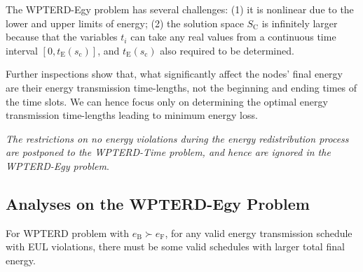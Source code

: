 \documentclass[12pt,journal,onecolumn,draftcls]{IEEEtran}
\begin{document}
The WPTERD-Egy problem has several challenges: (1) it is nonlinear due to the lower and upper limits of energy; (2) the solution space $S_\text{C}$ is infinitely larger because that the variables $t_i$ can take any real values from a continuous time interval $[0, t_\text{E}(s_\text{c})]$, and $t_\text{E}(s_\text{c})$ also required to be determined.

Further inspections show that, what significantly affect the nodes' final energy are their energy transmission time-lengths, not the beginning and ending times of the time slots. We can hence focus only on determining the optimal energy transmission time-lengths leading to minimum energy loss.

\textit{The restrictions on no energy violations during the energy redistribution process are postponed to the WPTERD-Time problem, and hence are ignored in the WPTERD-Egy problem}.

\subsection{Analyses on the WPTERD-Egy Problem}

\begin{lemma}
\label{lemma_violation}
For WPTERD problem with $e_\text{B}{\succ}e_\text{F}$, for any valid energy transmission schedule with EUL violations, there must be some valid schedules with larger total final energy.
\end{lemma}
\end{document}
